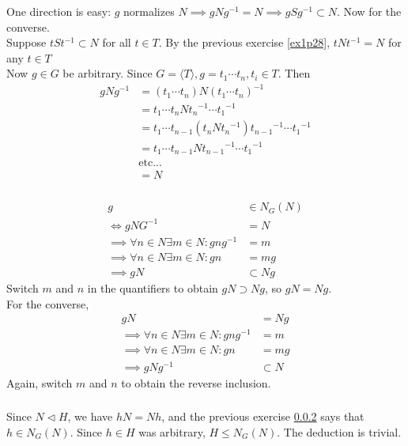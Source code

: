 \documentclass{article}
\newcommand{\inv}[1]{ {#1}^{-1} }
\newcommand{\cyclic}[1]{\langle#1\rangle}
\begin{document}
\subsubsection{}\label{ex1p29}
One direction is easy: $g$ normalizes $N \implies gN\inv{g} = N \implies gS\inv{g} \subset N$. Now for the converse.\\
Suppose $tS\inv{t} \subset N$ for all $t\in T$. By the previous exercise \ref{ex1p28}, $tN\inv{t} = N$ for any $t\in T$\\
Now $g\in G$ be arbitrary. Since $G=\cyclic{T}, g=t_1\cdots t_n, t_i \in T$. Then
\begin{align*}
gN\inv{g} &=  (t_1\cdots t_n)N(t_1\cdots t_n)^{-1}\\
&=  t_1\cdots t_nN\inv{t_n}\cdots \inv{t_1}\\
&=  t_1\cdots t_{n-1}(t_nN\inv{t_n})\inv{t_{n-1}}\cdots \inv{t_1}\\
&=
t_1\cdots t_{n-1}N\inv{t_{n-1}}\cdots \inv{t_1}\\
& \mbox{etc...}\\
&= N
\end{align*}
\subsubsection{}\label{ex1p30}
\begin{align*}
g &\in N_G(N)\\
\iff gN\inv{G} &= N\\
\implies\forall n\in N \exists m\in N: gn\inv{g} &= m\\
\implies\forall n\in N \exists m\in N: gn &= mg\\
\implies gN &\subset Ng
\end{align*}
Switch $m$ and $n$ in the quantifiers to obtain $gN \supset Ng$, so $gN=Ng$.\\
For the converse, 
\begin{align*}
gN &= Ng\\
\implies\forall n\in N \exists m\in N: gn\inv{g} &= m\\
\implies\forall n\in N \exists m\in N: gn &= mg\\
\implies gN\inv{g} &\subset N
\end{align*}
Again, switch $m$ and $n$ to obtain the reverse inclusion.
\subsubsection{}\label{ex1p31}
Since $N\lhd H$, we have $hN = Nh$, and the previous exercise \ref{ex1p30} says that $h\in N_G(N)$. Since $h\in H$ was arbitrary, $H\leq N_G(N)$. The deduction is trivial.
\end{document}
